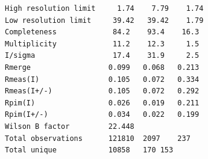 \documentclass[slides,compress]{beamer}
\begin{document}
\begin{frame}[fragile]
\begin{verbatim}
High resolution limit     1.74	  7.79	  1.74
Low resolution limit     39.42	 39.42	  1.79
Completeness          	 84.2	 93.4	 16.3
Multiplicity          	 11.2	 12.3	  1.5
I/sigma               	 17.4	 31.9	  2.5
Rmerge                	0.099	0.068	0.213
Rmeas(I)              	0.105	0.072	0.334
Rmeas(I+/-)           	0.105	0.072	0.292
Rpim(I)               	0.026	0.019	0.211
Rpim(I+/-)            	0.034	0.022	0.199
Wilson B factor       	22.448
Total observations    	121810	2097	237
Total unique          	10858	170	153
\end{verbatim}
\end{frame}

\end{document}
